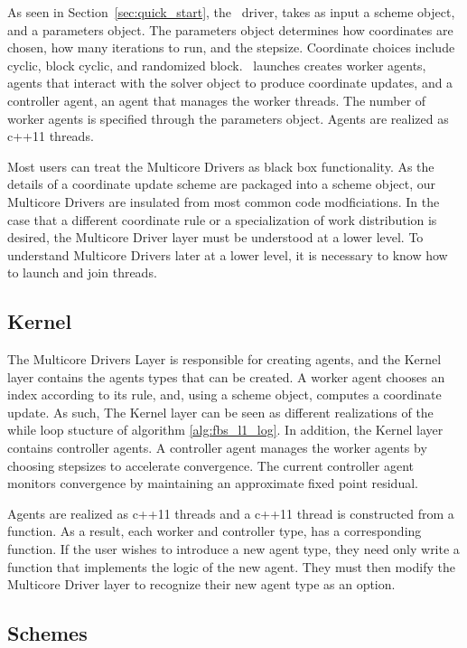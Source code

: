 As seen in Section~\ref{sec:quick_start}, the \pkg~driver, takes as input a scheme object, and a parameters object.
The parameters object determines how coordinates are chosen, how many iterations to run, and the stepsize.
Coordinate choices include cyclic, block cyclic, and randomized block. 
\pkg~launches creates  worker agents, agents that interact with the solver object to produce coordinate updates, and a controller agent, an agent that manages the worker threads.
The number of worker agents is specified through the parameters object.
Agents are realized as c++11 threads.

Most users can treat the Multicore Drivers as black box functionality.
As the details of a coordinate update scheme are packaged into a scheme object, our Multicore Drivers are insulated from most common code modficiations.
In the case that a different coordinate rule or a specialization of work distribution is desired, the Multicore Driver layer must be understood at a lower level.
To understand  Multicore Drivers later at a lower level, it is necessary to know how to launch and join threads.


\subsection{Kernel}


The Multicore Drivers Layer is responsible for creating agents, and the Kernel layer contains the agents types that can be created.
A worker agent chooses an index according to its rule, and, using a scheme object, computes a coordinate update.
As such, The Kernel layer can be seen as different realizations of the while loop stucture of algorithm \ref{alg:fbs_l1_log}.
In addition, the Kernel layer contains controller agents.
A controller agent manages the worker agents by choosing stepsizes to accelerate convergence.
The current controller agent monitors convergence by maintaining an approximate fixed point residual.

Agents are realized as c++11 threads and a c++11 thread is constructed from a function.
As a result, each worker and controller type, has  a corresponding function.
If the user wishes to introduce a new agent type, they need only write a function that implements the logic of the new agent.
They must then modify the Multicore Driver layer to recognize their new agent type as an option.

\subsection{Schemes}

